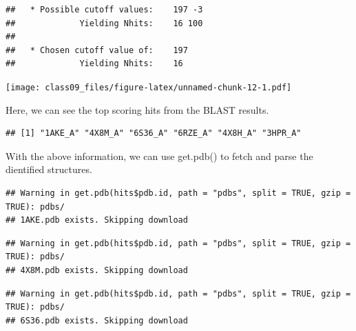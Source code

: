 \documentclass[
]{article}
\newenvironment{Shaded}{\begin{snugshade}}{\end{snugshade}}
\newcommand{\AttributeTok}[1]{\textcolor[rgb]{0.77,0.63,0.00}{#1}}
\newcommand{\CommentTok}[1]{\textcolor[rgb]{0.56,0.35,0.01}{\textit{#1}}}
\newcommand{\ConstantTok}[1]{\textcolor[rgb]{0.00,0.00,0.00}{#1}}
\newcommand{\FunctionTok}[1]{\textcolor[rgb]{0.00,0.00,0.00}{#1}}
\newcommand{\NormalTok}[1]{#1}
\newcommand{\OtherTok}[1]{\textcolor[rgb]{0.56,0.35,0.01}{#1}}
\newcommand{\SpecialCharTok}[1]{\textcolor[rgb]{0.00,0.00,0.00}{#1}}
\newcommand{\StringTok}[1]{\textcolor[rgb]{0.31,0.60,0.02}{#1}}
\begin{document}
\begin{verbatim}
##   * Possible cutoff values:    197 -3 
##             Yielding Nhits:    16 100 
## 
##   * Chosen cutoff value of:    197 
##             Yielding Nhits:    16
\end{verbatim}

\texttt{[image: class09\_files/figure-latex/unnamed-chunk-12-1.pdf]}

Here, we can see the top scoring hits from the BLAST results.

\begin{Shaded}
\end{Shaded}

\begin{verbatim}
## [1] "1AKE_A" "4X8M_A" "6S36_A" "6RZE_A" "4X8H_A" "3HPR_A"
\end{verbatim}

With the above information, we can use get.pdb() to fetch and parse the
dientified structures.

\begin{Shaded}
\end{Shaded}

\begin{verbatim}
## Warning in get.pdb(hits$pdb.id, path = "pdbs", split = TRUE, gzip = TRUE): pdbs/
## 1AKE.pdb exists. Skipping download
\end{verbatim}

\begin{verbatim}
## Warning in get.pdb(hits$pdb.id, path = "pdbs", split = TRUE, gzip = TRUE): pdbs/
## 4X8M.pdb exists. Skipping download
\end{verbatim}

\begin{verbatim}
## Warning in get.pdb(hits$pdb.id, path = "pdbs", split = TRUE, gzip = TRUE): pdbs/
## 6S36.pdb exists. Skipping download
\end{verbatim}
\end{document}
